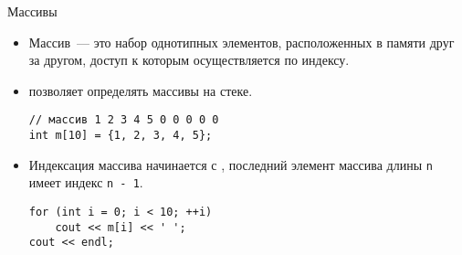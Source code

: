 \documentclass{beamer}
\begin{document}
\begin{frame}[fragile]{Массивы}
    \begin{itemize}
        \item Массив~— это набор однотипных элементов, расположенных в памяти
            друг за другом, доступ к которым осуществляется по индексу.

        \item \langcpp позволяет определять массивы на стеке.
\begin{lstlisting}
// массив 1 2 3 4 5 0 0 0 0 0
int m[10] = {1, 2, 3, 4, 5}; 
\end{lstlisting}

        \item Индексация массива начинается с , последний элемент
            массива длины {\tt n} имеет индекс {\tt n - 1}.
\begin{lstlisting}
for (int i = 0; i < 10; ++i)
    cout << m[i] << ' '; 
cout << endl;
\end{lstlisting}
    \end{itemize}
\end{frame}
\end{document}
